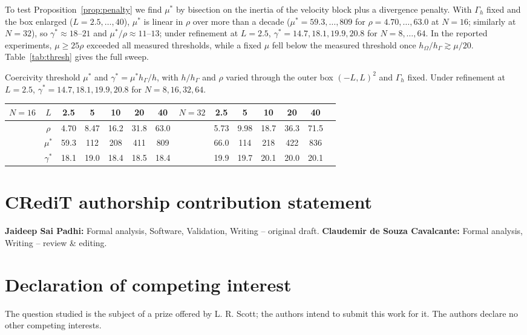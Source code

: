 \documentclass[5p,times]{elsarticle}
\theoremstyle{definition}
\newcommand{\hG}{h_\Gamma}
\newcommand{\hO}{h_\Omega}
\newcommand{\Gh}{\Gamma_h}
\begin{document}
To test Proposition~\ref{prop:penalty} we find $\mu^\ast$ by bisection on the inertia of the velocity block plus a divergence penalty. With $\Gh$ fixed and the box enlarged ($L=2.5,\dots,40$), $\mu^\ast$ is linear in $\rho$ over more than a decade ($\mu^\ast=59.3,\dots,809$ for $\rho=4.70,\dots,63.0$ at $N=16$; similarly at $N=32$), so $\gamma^\ast\approx18$--$21$ and $\mu^\ast/\rho\approx11$--$13$; under refinement at $L=2.5$, $\gamma^\ast=14.7,18.1,19.9,20.8$ for $N=8,\dots,64$. In the reported experiments, $\mu\ge25\rho$ exceeded all measured thresholds, while a fixed $\mu$ fell below the measured threshold once $\hO/\hG\gtrsim\mu/20$. Table~\ref{tab:thresh} gives the full sweep.

\begin{\tabenv}[!tb]
\centering\footnotesize\setlength{\tabcolsep}{4pt}
\caption{Coercivity threshold $\mu^\ast$ and $\gamma^\ast=\mu^\ast\hG/h$, with $h/\hG$ and $\rho$ varied through the outer box $(-L,L)^2$ and $\Gh$ fixed. Under refinement at $L=2.5$, $\gamma^\ast=14.7,18.1,19.9,20.8$ for $N=8,16,32,64$.}\label{tab:thresh}
\begin{tabular}{lcccccclcccccc}
\toprule
$N=16$ & $L$ & 2.5 & 5 & 10 & 20 & 40 & $N=32$ & 2.5 & 5 & 10 & 20 & 40\\
\midrule
 & $\rho$ & 4.70 & 8.47 & 16.2 & 31.8 & 63.0 & & 5.73 & 9.98 & 18.7 & 36.3 & 71.5\\
 & $\mu^\ast$ & 59.3 & 112 & 208 & 411 & 809 & & 66.0 & 114 & 218 & 422 & 836\\
 & $\gamma^\ast$ & 18.1 & 19.0 & 18.4 & 18.5 & 18.4 & & 19.9 & 19.7 & 20.1 & 20.0 & 20.1\\
\bottomrule
\end{tabular}
\end{\tabenv}

\section*{CRediT authorship contribution statement}
\textbf{Jaideep Sai Padhi:} Formal analysis, Software, Validation, Writing -- original draft. \textbf{Claudemir de Souza Cavalcante:} Formal analysis, Writing -- review \& editing.

\section*{Declaration of competing interest}
The question studied is the subject of a prize offered by L. R. Scott; the authors intend to submit this work for it. The authors declare no other competing interests.
\end{document}
